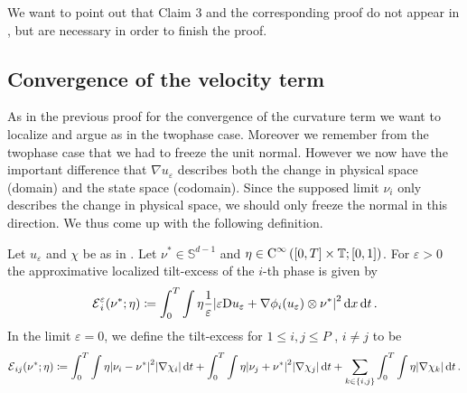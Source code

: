 We want to point out that Claim 3 and the corresponding proof do not appear in 
\cite{convergence_of_allen_cahn_equation_to_multiphase_mean_curvature_flow}, 
but are necessary in order to finish the proof.

\subsection{Convergence of the velocity term}

As in the previous proof for the convergence of the curvature term we want to 
localize and argue as in the twophase case. Moreover we remember from the 
twophase case that we had to freeze the unit normal. However we now have the 
important difference that $ \nabla u_{ \varepsilon } $ describes both the 
change in physical space (domain) and the state space (codomain). Since the 
supposed limit $ \nu_{ i } $ only describes the change in physical space, we 
should only freeze the normal in this direction. We thus come up with the 
following definition.

\begin{comment}Using the equipartition of 
energies (\Cref{equipartition_of_energies_multiphase}) which tells us that $ 
\varepsilon / 2 \abs{ \nabla u_{ \varepsilon } }^{ 2 } $ roughly equals $ 1 / 
\varepsilon W ( u_{ \varepsilon } ) $, we come up with the following definition 
which is similar to the tilt-excess defined in the twophase case.
\end{comment}

\begin{definition}
	Let $ u _{ \varepsilon } $ and $ \chi $ be as in 
	.
	Let $ \nu^{ \ast } \in \mathbb{ S }^{ d - 1 } $ and $ \eta \in \operatorname{C}^{ 
		\infty } \left( [ 0 , T ] \times \operatorname{\mathbb{T}} ; [ 0 , 1 ] \right) $. For 
		$ 
	\varepsilon > 0 $  the 
	approximative localized tilt-excess of the $ i$-th phase is given by
	\begin{equation*}
		\tilt_excess_{ i }^{ \varepsilon } ( \nu^{ \ast } ; \eta )
		\coloneqq
		\int_{ 0 }^{ T }
		\int
		\eta
		\frac{ 1 }{ \varepsilon }
		\abs{ 
			\varepsilon \diff u_{ \varepsilon } 
			+
			\nabla \phi_{ i } ( u_{ \varepsilon } ) 
			\otimes
			\nu^{ \ast }
		}^{ 2 }
		\dd{ x }
		\dd{ t }.
	\end{equation*}
	In the limit $ \varepsilon = 0 $,
	we define the tilt-excess for $ 1 \leq i, j \leq P $ , $ i \neq j $ to be
	\begin{equation*}
		\tilt_excess_{ i j } ( \nu^{ \ast } ; \eta  ) 
		\coloneqq
		\int_{ 0 }^{ T }
		\int
		\eta
		\abs{ \nu_{ i } - \nu^{ \ast } }^{ 2 }
		\abs{ \nabla \chi_{ i } }
		\dd{ t }
		+
		\int_{ 0 }^{ T }
		\int
		\eta
		\abs{ \nu_{ j } + \nu^{ \ast } }^{ 2 }
		\abs{ \nabla \chi_{ j } }
		\dd{ t }
		+
		\sum_{ k \in \{ i , j \} }
		\int_{ 0 }^{ T }
		\int
		\eta 
		\abs{ \nabla \chi_{ k } }
		\dd{ t }.
	\end{equation*}
\end{definition}

